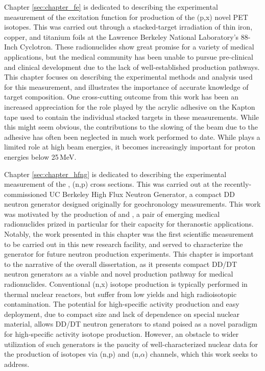Chapter \ref{sec:chapter_fe} is dedicated to describing the experimental measurement of the excitation function for production of the  (p,x) novel PET isotopes.
This was carried out through a stacked-target irradiation of thin iron, copper, and titanium foils at the Lawrence Berkeley National Laboratory's 88-Inch Cyclotron.
These radionuclides show great promise for a variety of medical applications, but the medical community has been unable to pursue pre-clinical and clinical development due to the lack of well-established production pathways.
This chapter focuses on describing the experimental methods and analysis used for this measurement, and illustrates the importance of accurate knowledge of target composition.
One cross-cutting outcome from this work has been an increased appreciation for the role played by the acrylic adhesive on the Kapton tape used to contain the individual stacked targets in these measurements. 
While this might seem obvious, the contributions to the slowing of the beam due to the adhesive has often been neglected in much work performed to date. 
While plays a limited role at high beam energies, it becomes increasingly important for proton energies below 25\,MeV. 



Chapter \ref{sec:chapter_hfng} is dedicated to describing the experimental measurement of the , (n,p) cross sections.
This was carried out at the recently-commissioned UC Berkeley High Flux Neutron Generator, a compact DD neutron generator designed originally for geochronology measurements.
This work was motivated by the production of   and , a pair of  emerging medical radionuclides prized in particular for their capacity for theranostic applications. 
Notably, the work presented in this chapter was the first scientific measurement to be carried out in this new research facility, and served to characterize the generator for future neutron production experiments.
This chapter is important to the narrative of the overall dissertation, as it presents compact DD/DT neutron generators as a viable and novel production pathway for medical radionuclides.
Conventional (n,x) isotope production is typically performed in thermal nuclear reactors, but suffer from low yields and high radioisotopic contamination. 
The potential for high-specific activity production and easy deployment, due to compact size and lack of dependence on special nuclear material, allows  DD/DT neutron generators to stand poised as a novel paradigm for high-specific activity isotope production.
However, an obstacle to wider utilization of  such generators  is the paucity of well-characterized nuclear data for the production of isotopes via (n,p) and (n,$\alpha$) channels, which this work seeks to address.




